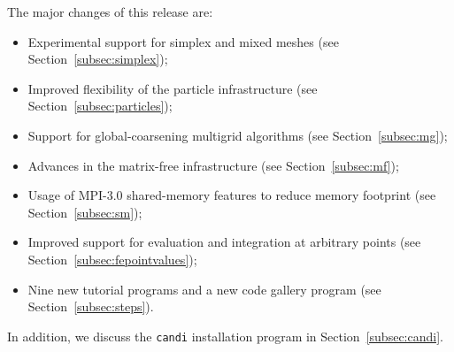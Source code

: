 \documentclass{ansarticle-preprint}
\newcommand{\specialword}[1]{\texttt{#1}}
\newcommand{\candi}{{\specialword{candi}}\xspace}
\begin{document}
The major changes of this release are:
%
\begin{itemize}
  \item Experimental support for simplex and mixed meshes (see Section~\ref{subsec:simplex});
  \item Improved flexibility of the particle infrastructure (see Section~\ref{subsec:particles});
  \item Support for global-coarsening multigrid algorithms (see Section~\ref{subsec:mg});
  \item Advances in the matrix-free infrastructure  (see Section~\ref{subsec:mf});
  \item Usage of MPI-3.0 shared-memory features to reduce memory footprint  (see Section~\ref{subsec:sm});
  \item Improved support for evaluation and integration at arbitrary points (see Section~\ref{subsec:fepointvalues});
  \item Nine new tutorial programs and a new code gallery program (see Section~\ref{subsec:steps}).
\end{itemize}
%
In addition, we discuss the \candi{} installation program in Section~\ref{subsec:candi}.
\end{document}
